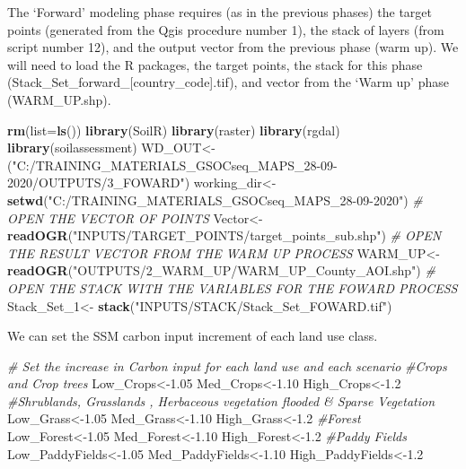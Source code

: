 \documentclass[
  10pt,
  b5paper,
]{book}
\newenvironment{Shaded}{\begin{snugshade}}{\end{snugshade}}
\newcommand{\CommentTok}[1]{\textcolor[rgb]{0.56,0.35,0.01}{\textit{#1}}}
\newcommand{\DataTypeTok}[1]{\textcolor[rgb]{0.13,0.29,0.53}{#1}}
\newcommand{\DecValTok}[1]{\textcolor[rgb]{0.00,0.00,0.81}{#1}}
\newcommand{\FloatTok}[1]{\textcolor[rgb]{0.00,0.00,0.81}{#1}}
\newcommand{\KeywordTok}[1]{\textcolor[rgb]{0.13,0.29,0.53}{\textbf{#1}}}
\newcommand{\NormalTok}[1]{#1}
\newcommand{\StringTok}[1]{\textcolor[rgb]{0.31,0.60,0.02}{#1}}
\begin{document}
The `Forward' modeling phase requires (as in the previous phases) the target points (generated from the Qgis procedure number 1), the stack of layers (from script number 12), and the output vector from the previous phase (warm up). We will need to load the R packages, the target points, the stack for this phase (Stack\_Set\_forward\_{[}country\_code{]}.tif), and vector from the `Warm up' phase (WARM\_UP.shp).

\begin{Shaded}
\begin{Highlighting}[]
\KeywordTok{rm}\NormalTok{(}\DataTypeTok{list=}\KeywordTok{ls}\NormalTok{()) }
\KeywordTok{library}\NormalTok{(SoilR)}
\KeywordTok{library}\NormalTok{(raster)}
\KeywordTok{library}\NormalTok{(rgdal)}
\KeywordTok{library}\NormalTok{(soilassessment)}
\NormalTok{WD_OUT<-(}\StringTok{"C:/TRAINING_MATERIALS_GSOCseq_MAPS_28-09-2020/OUTPUTS/3_FOWARD"}\NormalTok{)}
\NormalTok{working_dir<-}\KeywordTok{setwd}\NormalTok{(}\StringTok{"C:/TRAINING_MATERIALS_GSOCseq_MAPS_28-09-2020"}\NormalTok{)}
\CommentTok{# OPEN THE VECTOR OF POINTS}
\NormalTok{Vector<-}\KeywordTok{readOGR}\NormalTok{(}\StringTok{"INPUTS/TARGET_POINTS/target_points_sub.shp"}\NormalTok{)}
\CommentTok{# OPEN THE RESULT VECTOR FROM THE WARM UP PROCESS}
\NormalTok{WARM_UP<-}\KeywordTok{readOGR}\NormalTok{(}\StringTok{"OUTPUTS/2_WARM_UP/WARM_UP_County_AOI.shp"}\NormalTok{)}
\CommentTok{# OPEN THE STACK WITH THE VARIABLES FOR THE FOWARD PROCESS}
\NormalTok{Stack_Set_}\DecValTok{1}\NormalTok{<-}\StringTok{ }\KeywordTok{stack}\NormalTok{(}\StringTok{"INPUTS/STACK/Stack_Set_FOWARD.tif"}\NormalTok{)}
\end{Highlighting}
\end{Shaded}

We can set the SSM carbon input increment of each land use class.

\begin{Shaded}
\begin{Highlighting}[]
\CommentTok{# Set the increase in Carbon input for each land use and each scenario}
\CommentTok{#Crops and Crop trees}
\NormalTok{Low_Crops<-}\FloatTok{1.05}
\NormalTok{Med_Crops<-}\FloatTok{1.10}
\NormalTok{High_Crops<-}\FloatTok{1.2}
\CommentTok{#Shrublands, Grasslands , Herbaceous vegetation flooded & Sparse Vegetation}
\NormalTok{Low_Grass<-}\FloatTok{1.05}
\NormalTok{Med_Grass<-}\FloatTok{1.10}
\NormalTok{High_Grass<-}\FloatTok{1.2}
\CommentTok{#Forest}
\NormalTok{Low_Forest<-}\FloatTok{1.05}
\NormalTok{Med_Forest<-}\FloatTok{1.10}
\NormalTok{High_Forest<-}\FloatTok{1.2}
\CommentTok{#Paddy Fields}
\NormalTok{Low_PaddyFields<-}\FloatTok{1.05}
\NormalTok{Med_PaddyFields<-}\FloatTok{1.10}
\NormalTok{High_PaddyFields<-}\FloatTok{1.2}
\end{Highlighting}
\end{Shaded}
\end{document}
